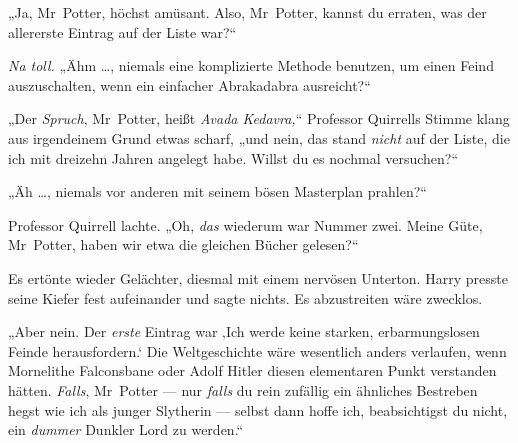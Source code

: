 „Ja, Mr~Potter, höchst amüsant. Also, Mr~Potter, kannst du erraten, was der allererste Eintrag auf der Liste war?“

\emph{Na toll.} „Ähm …, niemals eine komplizierte Methode benutzen, um einen Feind auszuschalten, wenn ein einfacher Abrakadabra ausreicht?“

„Der \emph{Spruch}, Mr~Potter, heißt \emph{Avada Kedavra,}“ Professor Quirrells Stimme klang aus irgendeinem Grund etwas scharf, „und nein, das stand \emph{nicht} auf der Liste, die ich mit dreizehn Jahren angelegt habe. Willst du es nochmal versuchen?“

„Äh …, niemals vor anderen mit seinem bösen Masterplan prahlen?“

Professor Quirrell lachte.
„Oh, \emph{das} wiederum war Nummer zwei. Meine Güte, Mr~Potter, haben wir etwa die gleichen Bücher gelesen?“

Es ertönte wieder Gelächter, diesmal mit einem nervösen Unterton. Harry presste seine Kiefer fest aufeinander und sagte nichts. Es abzustreiten wäre zwecklos.

„Aber nein. Der \emph{erste} Eintrag war ‚Ich werde keine starken, erbarmungslosen Feinde herausfordern.‘ Die Weltgeschichte wäre wesentlich anders verlaufen, wenn Mornelithe Falconsbane oder Adolf Hitler diesen elementaren Punkt verstanden hätten. \emph{Falls}, Mr~Potter — nur \emph{falls} du rein zufällig ein ähnliches Bestreben hegst wie ich als junger Slytherin — selbst dann hoffe ich, beabsichtigst du nicht, ein \emph{dummer} Dunkler Lord zu werden.“

